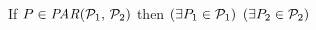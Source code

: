   

  \noindent
  If $\aPS \in \sPAR{\aPSS_1}{\aPSS_2}$ then  
  $(\exists P_1\in\mathcal{P}_1)$ $(\exists P_2\in\mathcal{P}_2)$
